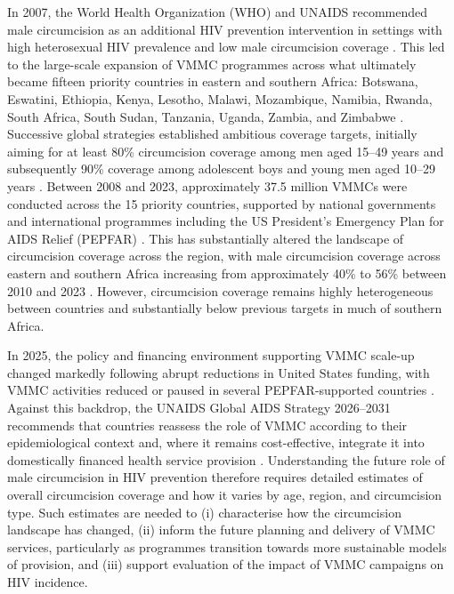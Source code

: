 \documentclass{article}
\begin{document}
\noindent In 2007, the World Health Organization (WHO) and UNAIDS recommended male circumcision as an additional HIV prevention intervention in settings with high heterosexual HIV prevalence and low male circumcision coverage \cite{WHOUNAIDS2007MC}. This led to the large-scale expansion of VMMC programmes across what ultimately became fifteen priority countries in eastern and southern Africa: Botswana, Eswatini, Ethiopia, Kenya, Lesotho, Malawi, Mozambique, Namibia, Rwanda, South Africa, South Sudan, Tanzania, Uganda, Zambia, and Zimbabwe \cite{UNAIDSJoint, davis2018progress, WHOVoluntary2}. Successive global strategies established ambitious coverage targets, initially aiming for at least 80\% circumcision coverage among men aged 15--49 years and subsequently 90\% coverage among adolescent boys and young men aged 10--29 years \cite{WHOJointFramework, WHOFramework}. Between 2008 and 2023, approximately 37.5 million VMMCs were conducted  across the 15 priority countries, supported by national governments and international programmes including the US President's Emergency Plan for AIDS Relief (PEPFAR) \cite{UNAIDS2025}. This has substantially altered the landscape of circumcision coverage across the region, with male circumcision coverage across eastern and southern Africa increasing from approximately 40\% to 56\% between 2010 and 2023 \cite{UNAIDS2025}. However, circumcision coverage remains highly heterogeneous between countries and substantially below previous targets in much of southern Africa.

\noindent In 2025, the policy and financing environment supporting VMMC scale-up changed markedly following abrupt reductions in United States funding, with VMMC activities reduced or paused in several PEPFAR-supported countries \cite{UNAIDS2025}. Against this backdrop, the UNAIDS Global AIDS Strategy 2026--2031 recommends that countries reassess the role of VMMC according to their epidemiological context and, where it remains cost-effective, integrate it into domestically financed health service provision \cite{UNAIDSStrategy}. Understanding the future role of male circumcision in HIV prevention therefore requires detailed estimates of overall circumcision coverage and how it varies by age, region, and circumcision type. Such estimates are needed to (i) characterise how the circumcision landscape has changed, (ii) inform the future planning and delivery of VMMC services, particularly as programmes transition towards more sustainable models of provision, and (iii) support evaluation of the impact of VMMC campaigns on HIV incidence. 
\end{document}
